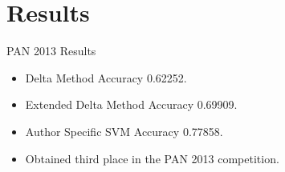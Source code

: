 \documentclass[10pt]{beamer}
\begin{document}
\section{Results}

\begin{frame}[fragile]{PAN 2013 Results}

    \begin{itemize}
        \item Delta Method Accuracy 0.62252.
        \item Extended Delta Method Accuracy 0.69909.
        \item Author Specific SVM Accuracy 0.77858.
        \item Obtained third place in the PAN 2013 competition.
    \end{itemize}

\end{frame}
\end{document}
